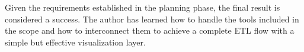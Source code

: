 




\nonzeroparskip Given the requirements established in the planning phase, the final result is considered a success. The author has learned how to handle the tools included in the scope and how to interconnect them to achieve a complete ETL flow with a simple but effective visualization layer.

